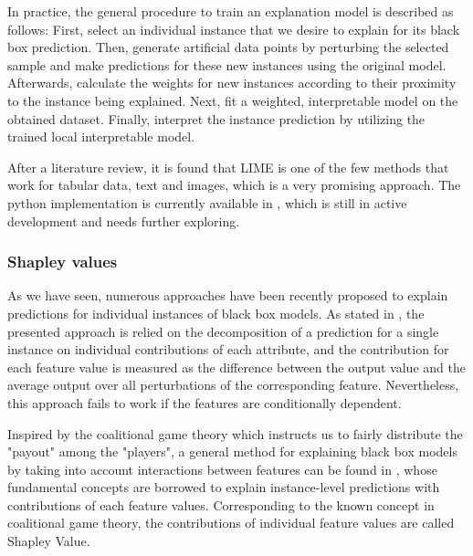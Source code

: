 In practice, the general procedure to train an explanation model is described as follows: First, select an individual instance that we desire to explain for its black box prediction. Then, generate artificial data points by perturbing the selected sample and make predictions for these new instances using the original model. Afterwards, calculate the weights for new instances according to their proximity to the instance being explained. Next, fit a weighted, interpretable model on the obtained dataset. Finally, interpret the instance prediction by utilizing the trained local interpretable model. 

After a literature review, it is found that LIME is one of the few methods that work for tabular data, text and images, which is a very promising approach. The python implementation is currently available in \cite{lime}, which is still in active development and needs further exploring. 

\subsubsection{Shapley values}

As we have seen, numerous approaches have been recently proposed to explain predictions for individual instances of black box models. As stated in \cite{robnik2008explaining}, the presented approach is relied on the decomposition of a prediction for a single instance on individual contributions of each attribute, and the contribution for each feature value is measured as the difference between the output value and the average output over all perturbations of the corresponding feature. Nevertheless, this approach fails to work if the features are conditionally dependent. 

Inspired by the coalitional game theory which instructs us to fairly distribute the "payout" among the "players", a general method for explaining black box models by taking into account interactions between features can be found in \cite{kononenko2010efficient}, whose fundamental concepts are borrowed to explain instance-level predictions with contributions of each feature values. Corresponding to the known concept in coalitional game theory, the contributions of individual feature values are called Shapley Value.

